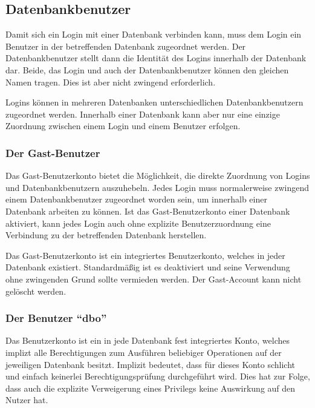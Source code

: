         \subsection{Datenbankbenutzer}
          Damit sich ein Login mit einer Datenbank verbinden kann, muss dem
          Login ein Benutzer in der betreffenden Datenbank zugeordnet werden.
          Der Datenbankbenutzer stellt dann die Identität des Logins innerhalb
          der Datenbank dar. Beide, das Login und auch der Datenbankbenutzer
          können den gleichen Namen tragen. Dies ist aber nicht zwingend
          erforderlich.
          
          Logins können in mehreren Datenbanken unterschiedlichen
          Datenbankbenutzern zugeordnet werden. Innerhalb einer Datenbank kann
          aber nur eine einzige Zuordnung zwischen einem Login und einem
          Benutzer erfolgen.        
          \subsubsection{Der Gast-Benutzer}
            Das Gast-Benutzerkonto bietet die Möglichkeit, die direkte Zuordnung
            von Logins und Datenbankbenutzern auszuhebeln. Jedes Login muss
            normalerweise zwingend einem Datenbankbenutzer zugeordnet worden
            sein, um innerhalb einer Datenbank arbeiten zu können. Ist das
            Gast-Benutzerkonto einer Datenbank aktiviert, kann jedes Login auch
            ohne explizite Benutzerzuordnung eine Verbindung zu der betreffenden
            Datenbank herstellen.
            \begin{merke}
              Das Gast-Benutzerkonto ist ein integriertes Benutzerkonto, welches
              in jeder Datenbank existiert. Standardmäßig ist es deaktiviert und
              seine Verwendung ohne zwingenden Grund sollte vermieden werden.
              Der Gast-Account kann nicht gelöscht werden.
            \end{merke}
          \subsubsection{Der Benutzer \enquote{dbo}}
            Das Benutzerkonto  ist ein in jede Datenbank fest
            integriertes Konto, welches implizt alle Berechtigungen zum
            Ausführen beliebiger Operationen auf der jeweiligen Datenbank
            besitzt. Implizit bedeutet, dass für dieses Konto schlicht und
            einfach keinerlei Berechtigungsprüfung durchgeführt wird. Dies hat
            zur Folge, dass auch die explizite Verweigerung eines Privilegs
            keine Auswirkung auf den Nutzer  hat.
            

